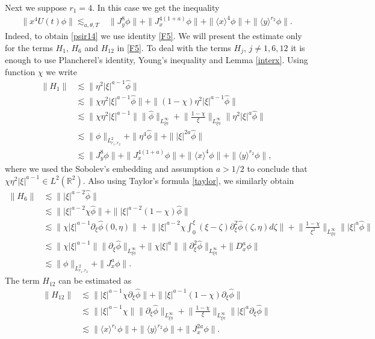 \documentclass[reqno]{amsart}
\newcommand{\ha}{\hat{\phi}}
\newcommand{\les}{\lesssim}
\newcommand{\La}{\|\phi\|_{L^2_{r_1,r_2}}}
\newcommand{\lanx}{\langle x \rangle}
\newcommand{\lany}{\langle y \rangle}
\newcommand{\R}{\mathbb R}
\newcommand{\p}{\partial}
\numberwithin{equation}{section}
\begin{document}
Next we suppose $r_1=4$. In this case we get the inequality
\begin{equation}
\begin{split}\label{psir14}
\|x^4 U(t)\phi\|\lesssim_{a,\theta,T}& \|J_y^{8}\phi\|+\|J_x^{4(1+a)}\phi\|+\|\lanx^{4}\phi\|+\|\lany^{r_2}\phi\|. 
\end{split}
\end{equation}
Indeed, to obtain \eqref{psir14} we use identity \eqref{F5}. We will present the estimate  only for the terms $H_1$, $H_6$ and $H_{12}$ in \eqref{F5}. To deal with the terms $H_j$, $j\neq 1,6, 12$ it is enough to use Plancherel's identity, Young's inequality and Lemma \ref{interx}.  Using function $\chi$ we write
\begin{equation}
\begin{split}\label{H1}
\|H_1\|&\les \|\eta^2 |\xi|^{a-1}\ha\|\\
&\les \|\chi \eta^2 |\xi|^{a-1}\ha\|+\|(1-\chi)\eta^2 |\xi|^{a-1}\ha\|\\
&\les\|\chi\eta^2|\xi|^{a-1}\|\|\ha\|_{L^\infty_{\xi\eta}}+\Big \|\frac{1-\chi}{\xi}\Big\|_{L^\infty_{\xi \eta}}\|\eta^2 |\xi|^a \ha\|\\
&\les \La +\|\eta^4 \ha\|+\||\xi|^{2a}\ha\|\\
&\les \|J_y^{8}\phi\|+\|J_x^{4(1+a)}\phi\|+\|\lanx^{4}\phi\|+\|\lany^{r_2}\phi\|,
\end{split}
\end{equation}
where   we used the Sobolev's embedding and  assumption $a>1/2$ to conclude that $\chi\eta^2|\xi|^{a-1}\in L^2(\R^2)$.
Also using Taylor's formula \eqref{taylor}, we similarly obtain
\begin{equation}
\begin{split}\label{H6}
\|H_6\|&\les \||\xi|^{a-2}\ha\|\\
&\les\||\xi|^{a-2}\chi \ha\|+\||\xi|^{a-2}(1-\chi) \ha\|\\
&\les\|\chi |\xi|^{a-1}\p_\xi \ha(0,\eta)\|+\Big\||\xi|^{a-2}\chi \int_0^\xi (\xi-\zeta)\p_\xi^2\ha(\zeta,\eta)d\zeta\Big\|+\Big \|\frac{1-\chi}{\xi^2}\Big\|_{L^\infty_{\xi \eta}}\||\xi|^a \ha\|\\
&\les \|\chi |\xi|^{a-1}\| \|\p_\xi \ha\|_{L^\infty_{\xi \eta}}+\|\chi |\xi|^a\|\|\p_\xi^2\ha\|_{L^\infty_{\xi \eta}}+\|D_x^a \phi\|\\
&\les\La+\|J_x^a \phi\|.
\end{split}
\end{equation}
The term $H_{12}$ can be estimated as
\begin{equation}
\begin{split}\label{H14}
\|H_{12}\|&\les \||\xi|^{a-1}\chi \p_\xi \ha\|+\||\xi|^{a-1}(1-\chi) \p_\xi \ha\|\\
&\les\||\xi|^{a-1}\chi\|\|\p_\xi \ha\|_{L^\infty_{\xi \eta}}+\Big \|\frac{1-\chi}{\xi}\Big\|_{L^\infty_{\xi \eta}}\||\xi|^a \p_\xi \ha\|\\
&\les\|\lanx^{r_1}\phi\|+\|\lany^{r_2}\phi\|+\|J_x^{2a}\phi\|.
\end{split}
\end{equation}
\end{document}
